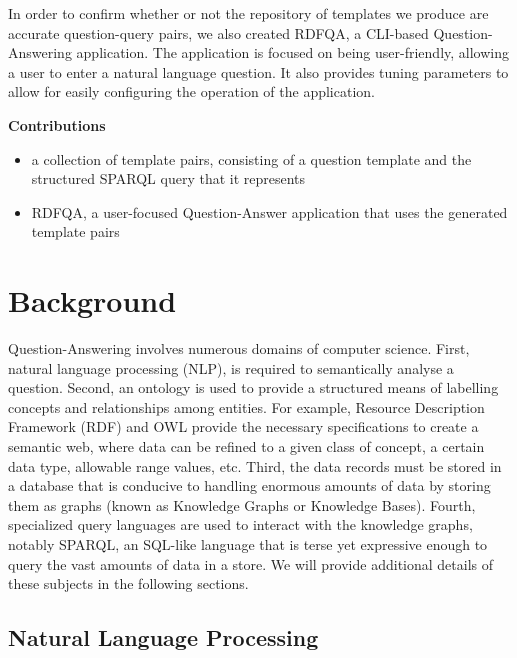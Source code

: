 \documentclass[sigplan,screen]{acmart}
\begin{document}
In order to confirm whether or not the repository of templates we produce are accurate question-query pairs, we also created RDFQA, a CLI-based Question-Answering application. The application is focused on being user-friendly, allowing a user to enter a natural language question. It also provides tuning parameters to allow for easily configuring the operation of the application.

\textbf{Contributions}

\begin{itemize}
    \item a collection of template pairs, consisting of a question template and the structured SPARQL query that it represents
    \item RDFQA, a user-focused Question-Answer application that uses the generated template pairs
\end{itemize}

\section{Background}

Question-Answering involves numerous domains of computer science. First, natural language processing (NLP), is required to semantically analyse a question. Second, an ontology is used to provide a structured means of labelling concepts and relationships among entities. For example, Resource Description Framework (RDF) and OWL provide the necessary specifications to create a semantic web, where data can be refined to a given class of concept, a certain data type, allowable range values, etc. Third, the data records must be stored in a database that is conducive to handling enormous amounts of data by storing them as graphs (known as Knowledge Graphs or Knowledge Bases). Fourth, specialized query languages are used to interact with the knowledge graphs, notably SPARQL, an SQL-like language that is terse yet expressive enough to query the vast amounts of data in a store. We will provide additional details of these subjects in the following sections.

\subsection{Natural Language Processing}
\end{document}
